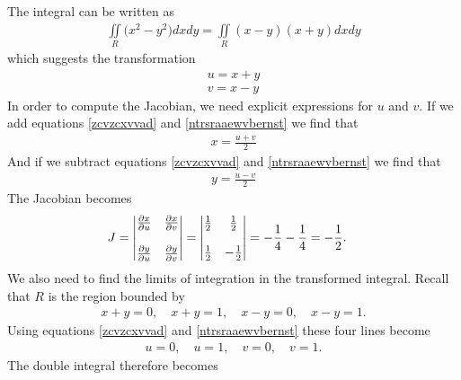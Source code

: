 \documentclass{article}
\begin{document}
\BEN
\item %
\item %
The integral can be written as
\begin{align*}
  \iint\limits_R \big(x^2 - y^2\big) dxdy =  \iint\limits_R (x - y)(x+y) dxdy
\end{align*}
which suggests the transformation 
\begin{align}
  u = x+y  \label{zcvzcxvvad}\\
  v = x - y \label{ntrsraaewvbernst}
\end{align}
In order to compute the Jacobian, we need explicit expressions for $u$ and $v$. If we add  equations \ref{zcvzcxvvad} and \ref{ntrsraaewvbernst} we find that 
\begin{align*}   x = \frac{u+v}{2}   \end{align*}
And if we subtract equations \ref{zcvzcxvvad} and \ref{ntrsraaewvbernst} we find that
\begin{align*}   y = \frac{u-v}{2}   \end{align*}
The Jacobian becomes
\begin{align*}   J &=  
  \begin{vmatrix}
   \frac{\partial x}{\partial u} &  \frac{\partial x}{\partial v} \\ \\
   \frac{\partial y}{\partial u} & \frac{\partial y}{\partial v} \\
  \end{vmatrix}
  =     \begin{vmatrix}
 \frac{1}{2} &  \frac{1}{2} \\ \\
   \frac{1}{2} & -\frac{1}{2} \\
  \end{vmatrix}
  = - \frac{1}{4}- \frac{1}{4} = - \frac{1}{2}.
 \end{align*}
We also need to find the limits of  integration in the transformed integral. Recall that $R$ is the region bounded by
\begin{align*}
  x+y = 0, \quad x+y = 1, \quad x-y=0, \quad x-y=1.
\end{align*}
Using equations \ref{zcvzcxvvad} and \ref{ntrsraaewvbernst} these four lines become 
\begin{align*}
  u = 0, \quad u = 1, \quad v=0, \quad v=1.
\end{align*}
The double integral therefore becomes
\end{document}
